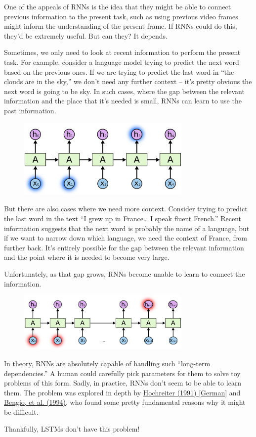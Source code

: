 One of the appeals of RNNs is the idea that they might be able to connect previous information to the present task, such as using previous video frames might inform the understanding of the present frame. If RNNs could do this, they’d be extremely useful. But can they? It depends.

Sometimes, we only need to look at recent information to perform the present task. For example, consider a language model trying to predict the next word based on the previous ones. If we are trying to predict the last word in “the clouds are in the sky,” we don’t need any further context – it’s pretty obvious the next word is going to be sky. In such cases, where the gap between the relevant information and the place that it’s needed is small, RNNs can learn to use the past information.
\begin{figure}[htbp]
	\centering
	\includegraphics[width=0.75\textwidth]{fig/32.png}
\end{figure}

But there are also cases where we need more context. Consider trying to predict the last word in the text “I grew up in France… I speak fluent French.” Recent information suggests that the next word is probably the name of a language, but if we want to narrow down which language, we need the context of France, from further back. It’s entirely possible for the gap between the relevant information and the point where it is needed to become very large.

Unfortunately, as that gap grows, RNNs become unable to learn to connect the information.
\begin{figure}[htbp]
	\centering
	\includegraphics[width=0.75\textwidth]{fig/3.png}
\end{figure}

In theory, RNNs are absolutely capable of handling such “long-term dependencies.” A human could carefully pick parameters for them to solve toy problems of this form. Sadly, in practice, RNNs don’t seem to be able to learn them. The problem was explored in depth by \href{http://people.idsia.ch/~juergen/SeppHochreiter1991ThesisAdvisorSchmidhuber.pdf}{Hochreiter (1991) [German]} and \href{http://www-dsi.ing.unifi.it/~paolo/ps/tnn-94-gradient.pdf}{Bengio, et al. (1994)}, who found some pretty fundamental reasons why it might be difficult.

Thankfully, LSTMs don’t have this problem!